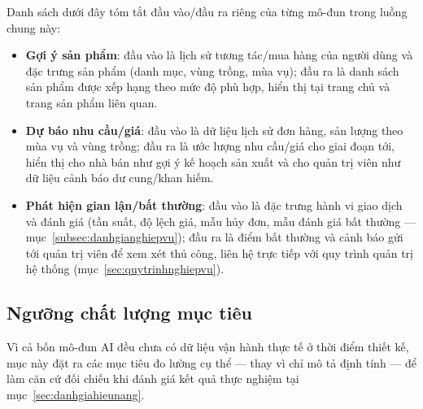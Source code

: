 Danh sách dưới đây tóm tắt đầu vào/đầu ra riêng của từng mô-đun trong luồng chung này:
\begin{itemize}
    \item \textbf{Gợi ý sản phẩm}: đầu vào là lịch sử tương tác/mua hàng của người dùng và đặc trưng sản phẩm (danh mục, vùng trồng, mùa vụ); đầu ra là danh sách sản phẩm được xếp hạng theo mức độ phù hợp, hiển thị tại trang chủ và trang sản phẩm liên quan.
    \item \textbf{Dự báo nhu cầu/giá}: đầu vào là dữ liệu lịch sử đơn hàng, sản lượng theo mùa vụ và vùng trồng; đầu ra là ước lượng nhu cầu/giá cho giai đoạn tới, hiển thị cho nhà bán như gợi ý kế hoạch sản xuất và cho quản trị viên như dữ liệu cảnh báo dư cung/khan hiếm.
    \item \textbf{Phát hiện gian lận/bất thường}: đầu vào là đặc trưng hành vi giao dịch và đánh giá (tần suất, độ lệch giá, mẫu hủy đơn, mẫu đánh giá bất thường --- mục~\ref{subsec:danhgianghiepvu}); đầu ra là điểm bất thường và cảnh báo gửi tới quản trị viên để xem xét thủ công, liên hệ trực tiếp với quy trình quản trị hệ thống (mục~\ref{sec:quytrinhnghiepvu}).
\end{itemize}

\subsection{Ngưỡng chất lượng mục tiêu}
\label{subsec:nguongAI}

Vì cả bốn mô-đun AI đều chưa có dữ liệu vận hành thực tế ở thời điểm thiết kế, mục này đặt ra các mục tiêu đo lường cụ thể --- thay vì chỉ mô tả định tính --- để làm căn cứ đối chiếu khi đánh giá kết quả thực nghiệm tại mục~\ref{sec:danhgiahieunang}.

